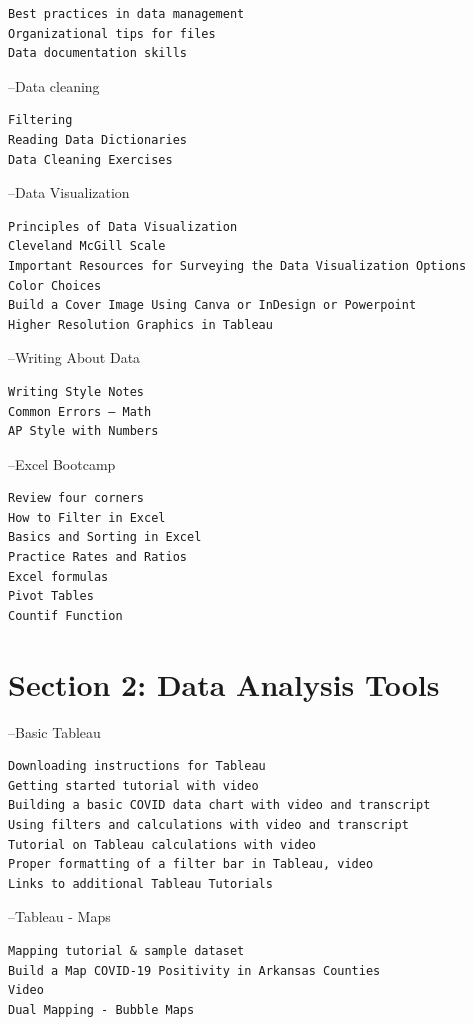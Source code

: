 \documentclass[]{book}
\begin{document}
\begin{verbatim}
Best practices in data management
Organizational tips for files
Data documentation skills
\end{verbatim}

--Data cleaning

\begin{verbatim}
Filtering
Reading Data Dictionaries
Data Cleaning Exercises
\end{verbatim}

--Data Visualization

\begin{verbatim}
Principles of Data Visualization
Cleveland McGill Scale
Important Resources for Surveying the Data Visualization Options
Color Choices
Build a Cover Image Using Canva or InDesign or Powerpoint
Higher Resolution Graphics in Tableau
\end{verbatim}

--Writing About Data

\begin{verbatim}
Writing Style Notes
Common Errors – Math
AP Style with Numbers
\end{verbatim}

--Excel Bootcamp

\begin{verbatim}
Review four corners
How to Filter in Excel
Basics and Sorting in Excel
Practice Rates and Ratios 
Excel formulas
Pivot Tables
Countif Function
\end{verbatim}

\hypertarget{section-2-data-analysis-tools}{%
\section{Section 2: Data Analysis Tools}\label{section-2-data-analysis-tools}}

--Basic Tableau

\begin{verbatim}
Downloading instructions for Tableau
Getting started tutorial with video
Building a basic COVID data chart with video and transcript
Using filters and calculations with video and transcript
Tutorial on Tableau calculations with video
Proper formatting of a filter bar in Tableau, video
Links to additional Tableau Tutorials
\end{verbatim}

--Tableau - Maps

\begin{verbatim}
Mapping tutorial & sample dataset
Build a Map COVID-19 Positivity in Arkansas Counties
Video
Dual Mapping - Bubble Maps
\end{verbatim}
\end{document}
